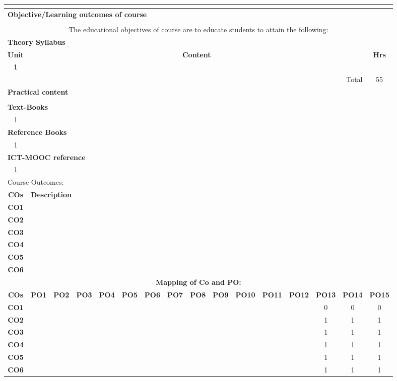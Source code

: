 \documentclass[a4paper]{article}%
\begin{document}
\begin{longtable}{|c|c|c|c|c|c|c|c|c|c|c|c|c|c|c|c|}
\hline%
\multicolumn{16}{|l|}{}\\%
\hline%
\multicolumn{16}{|l|}{\textbf{Objective/Learning outcomes of course}%
\cellcolor{black!30}}\\%
\multicolumn{16}{|l|}{\textbf{}}\\%
\hline%
\multicolumn{16}{|p{15cm}|}{The educational objectives of course are to educate students to attain the following:}\\%
\hline%
\multicolumn{16}{|l|}{\textbf{Theory Syllabus}%
\cellcolor{black!30}}\\%
\hline%
\textbf{Unit}&\multicolumn{14}{c|}{\textbf{Content}}&\textbf{Hrs}\\%
\hline%
\textbf{1}&\multicolumn{14}{|p{14cm}|}{}&\textbf{}\\%
\hline%
\multicolumn{15}{|r|}{Total}&55\\%
\hline%
\multicolumn{16}{|l|}{\textbf{Practical content}%
\cellcolor{black!30}}\\%
\multicolumn{16}{|l|}{\textbf{}}\\%
\hline%
\multicolumn{16}{|l|}{\textbf{Text{-}Books}%
\cellcolor{black!30}}\\%
\hline%
1&\multicolumn{15}{|p{15cm}|}{}\\%
\hline%
\multicolumn{16}{|l|}{\textbf{Reference Books}%
\cellcolor{black!30}}\\%
\hline%
1&\multicolumn{15}{|p{15cm}|}{}\\%
\hline%
\multicolumn{16}{|l|}{\textbf{ICT{-}MOOC reference}%
\cellcolor{black!30}}\\%
\hline%
1&\multicolumn{15}{|p{15cm}|}{}\\%
\hline%
\multicolumn{16}{|l|}{Course Outcomes:%
\cellcolor{black!30}}\\%
\hline%
\textbf{COs}&\multicolumn{15}{|l|}{\textbf{Description}}\\%
\hline%
\textbf{CO1}&\multicolumn{15}{|p{15cm}|}{}\\%
\hline%
\textbf{CO2}&\multicolumn{15}{|p{15cm}|}{}\\%
\hline%
\textbf{CO3}&\multicolumn{15}{|p{15cm}|}{}\\%
\hline%
\textbf{CO4}&\multicolumn{15}{|p{15cm}|}{}\\%
\hline%
\textbf{CO5}&\multicolumn{15}{|p{15cm}|}{}\\%
\hline%
\textbf{CO6}&\multicolumn{15}{|p{15cm}|}{}\\%
\hline%
\multicolumn{16}{|c|}{\textbf{Mapping of Co and PO:}}\\%
\hline%
\textbf{COs}&\textbf{PO1}&\textbf{PO2}&\textbf{PO3}&\textbf{PO4}&\textbf{PO5}&\textbf{PO6}&\textbf{PO7}&\textbf{PO8}&\textbf{PO9}&\textbf{PO10}&\textbf{PO11}&\textbf{PO12}&\textbf{PO13}&\textbf{PO14}&\textbf{PO15}\\%
\hline%
\textbf{CO1}&&&&&&&&&&&&&0&0&0\\%
\hline%
\textbf{CO2}&&&&&&&&&&&&&1&1&1\\%
\hline%
\textbf{CO3}&&&&&&&&&&&&&1&1&1\\%
\hline%
\textbf{CO4}&&&&&&&&&&&&&1&1&1\\%
\hline%
\textbf{CO5}&&&&&&&&&&&&&1&1&1\\%
\hline%
\textbf{CO6}&&&&&&&&&&&&&1&1&1\\%
\hline%
\end{longtable}%
\end{document}
